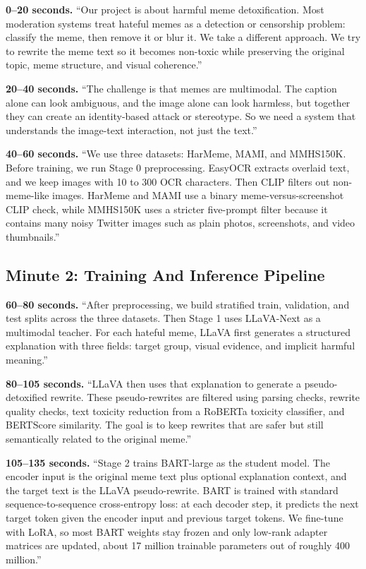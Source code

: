 \documentclass[11pt,a4paper]{article}
\begin{document}
\textbf{0--20 seconds.}
``Our project is about harmful meme detoxification. Most moderation systems treat hateful memes as a detection or censorship problem: classify the meme, then remove it or blur it. We take a different approach. We try to rewrite the meme text so it becomes non-toxic while preserving the original topic, meme structure, and visual coherence.''

\textbf{20--40 seconds.}
``The challenge is that memes are multimodal. The caption alone can look ambiguous, and the image alone can look harmless, but together they can create an identity-based attack or stereotype. So we need a system that understands the image-text interaction, not just the text.''

\textbf{40--60 seconds.}
``We use three datasets: HarMeme, MAMI, and MMHS150K. Before training, we run Stage 0 preprocessing. EasyOCR extracts overlaid text, and we keep images with 10 to 300 OCR characters. Then CLIP filters out non-meme-like images. HarMeme and MAMI use a binary meme-versus-screenshot CLIP check, while MMHS150K uses a stricter five-prompt filter because it contains many noisy Twitter images such as plain photos, screenshots, and video thumbnails.''

\subsection*{Minute 2: Training And Inference Pipeline}

\textbf{60--80 seconds.}
``After preprocessing, we build stratified train, validation, and test splits across the three datasets. Then Stage 1 uses LLaVA-Next as a multimodal teacher. For each hateful meme, LLaVA first generates a structured explanation with three fields: target group, visual evidence, and implicit harmful meaning.''

\textbf{80--105 seconds.}
``LLaVA then uses that explanation to generate a pseudo-detoxified rewrite. These pseudo-rewrites are filtered using parsing checks, rewrite quality checks, text toxicity reduction from a RoBERTa toxicity classifier, and BERTScore similarity. The goal is to keep rewrites that are safer but still semantically related to the original meme.''

\textbf{105--135 seconds.}
``Stage 2 trains BART-large as the student model. The encoder input is the original meme text plus optional explanation context, and the target text is the LLaVA pseudo-rewrite. BART is trained with standard sequence-to-sequence cross-entropy loss: at each decoder step, it predicts the next target token given the encoder input and previous target tokens. We fine-tune with LoRA, so most BART weights stay frozen and only low-rank adapter matrices are updated, about 17 million trainable parameters out of roughly 400 million.''
\end{document}
